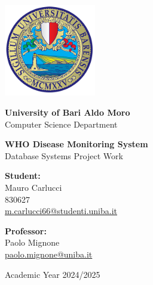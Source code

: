 \documentclass[11pt,a4paper]{article}
\begin{document}
\begin{titlepage}
	\centering
	
	\vspace*{1cm}
	\includegraphics[width=0.3\textwidth]{img/logo_uniba.png}
	
	\vspace{1.5cm}
	
	{\LARGE \textbf{University of Bari Aldo Moro}}\\[0.5cm]
	{\Large Computer Science Department}
	
	\vspace{2cm}
	
	{\huge \textbf{WHO Disease Monitoring System}}\\[0.3cm]
	{\Large Database Systems Project Work}
	
	\vfill
	
	\begin{minipage}{0.45\textwidth}
		\begin{flushleft}
			\textbf{Student:}\\
			Mauro Carlucci\\
			830627\\
			\href{mailto:m.carlucci66@studenti.uniba.it}{m.carlucci66@studenti.uniba.it}
		\end{flushleft}
	\end{minipage}
	\hfill
	\begin{minipage}{0.45\textwidth}
		\begin{flushright}
			\textbf{Professor:}\\
			Paolo Mignone\\
			\href{mailto:paolo.mignone@uniba.it}{paolo.mignone@uniba.it}
		\end{flushright}
	\end{minipage}
	
	\vspace{1.5cm}
	
	{\large Academic Year 2024/2025}\\[0.3cm]
	{}
	
\end{titlepage}
\end{document}
